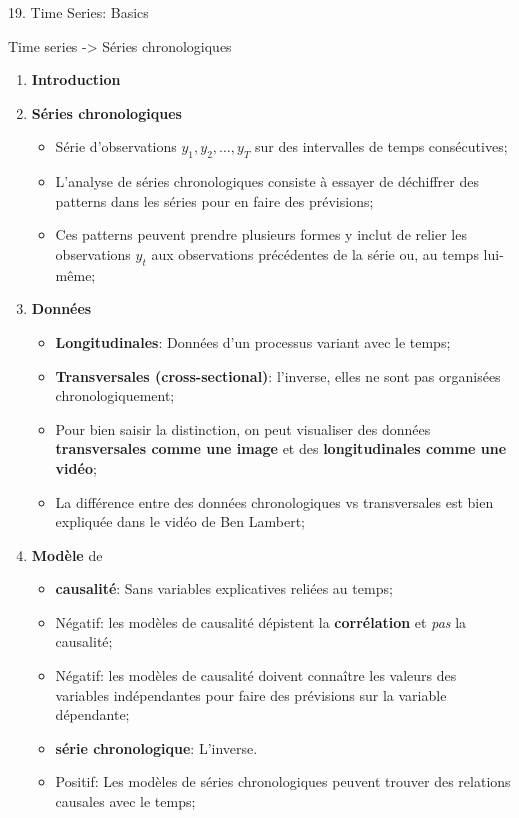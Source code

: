 \documentclass[12pt, titlepage, french]{report}
\begin{document}
\begin{CHPT_SUMM}{19. Time Series: Basics}
Time series -> Séries chronologiques
\begin{enumerate}
	\item	\textbf{Introduction}
	\item[]	\textbf{Séries chronologiques}
		\begin{itemize}
		\item	Série d'observations $y_{1}, y_{2}, \dots, y_{T}$ sur des intervalles de temps consécutives;
		\item	L'analyse de séries chronologiques consiste à essayer de déchiffrer des patterns dans les séries pour en faire des prévisions;
		\item[]	Ces patterns peuvent prendre plusieurs formes y inclut de relier les observations $y_{t}$ aux observations précédentes de la série ou, au temps lui-même;
		\end{itemize}
	\item[]	\textbf{Données}
		\begin{itemize}
		\item	\textbf{Longitudinales}: Données d'un processus variant avec le temps;
		\item	\textbf{Transversales (cross-sectional)}: l'inverse, elles ne sont pas organisées chronologiquement;
		\item	Pour bien saisir la distinction, on peut visualiser des données \textbf{transversales comme une image} et des \textbf{longitudinales comme une vidéo};
		\item	La différence entre des données chronologiques vs transversales est bien expliquée dans le vidéo de Ben Lambert;
		\end{itemize}
	\item[]	\textbf{Modèle} de 
		\begin{itemize}
		\item	\textbf{causalité}: Sans variables explicatives reliées au temps;
		\item[]	\textcolor{darkterracotta}{Négatif}: les modèles de causalité dépistent la \textbf{corrélation} et \emph{pas} la causalité;
		\item[]	\textcolor{darkterracotta}{Négatif}: les modèles de causalité doivent connaître les valeurs des variables indépendantes pour faire des prévisions sur la variable dépendante;
		\item	\textbf{série chronologique}: L'inverse.
		\item[]	\textcolor{ao(english)}{Positif}: Les modèles de séries chronologiques peuvent trouver des relations causales avec le temps;

\end{itemize}
\end{enumerate}
\end{CHPT_SUMM}
\end{document}
